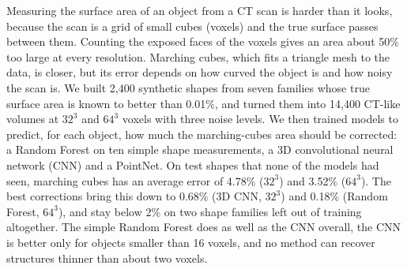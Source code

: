 Measuring the surface area of an object from a CT scan is harder than it looks, because the scan is a
grid of small cubes (voxels) and the true surface passes between them. Counting the exposed faces of
the voxels gives an area about 50\% too large at every resolution. Marching cubes, which fits a
triangle mesh to the data, is closer, but its error depends on how curved the object is and how noisy
the scan is. We built 2,400 synthetic shapes from seven families whose true surface area is known to
better than 0.01\%, and turned them into 14,400 CT-like volumes at $32^3$ and $64^3$ voxels with three
noise levels. We then trained models to predict, for each object, how much the marching-cubes area
should be corrected: a Random Forest on ten simple shape measurements, a 3D convolutional neural
network (CNN) and a PointNet. On test shapes that none of the models had seen, marching cubes has an
average error of 4.78\% ($32^3$) and 3.52\% ($64^3$). The best corrections bring this down to 0.68\%
(3D CNN, $32^3$) and 0.18\% (Random Forest, $64^3$), and stay below 2\% on two shape families left out of
training altogether. The simple Random Forest does as well as the CNN overall, the CNN is better only
for objects smaller than 16 voxels, and no method can recover structures thinner than about two voxels.
